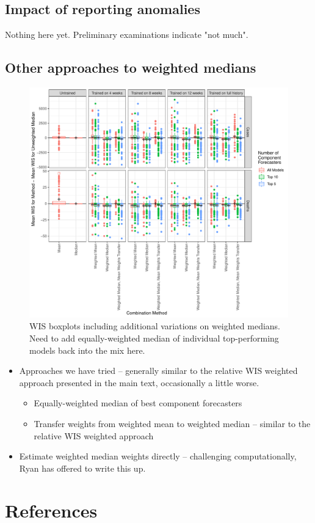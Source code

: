 \documentclass[review]{elsarticle}
\begin{document}
\subsection{Impact of reporting anomalies}

Nothing here yet.  Preliminary examinations indicate "not much".

\subsection{Other approaches to weighted medians}


\begin{figure}
  \includegraphics[width=\textwidth]{figures/wis_boxplots_all_combine_methods.pdf}
  \caption{WIS boxplots including additional variations on weighted medians.  Need to add equally-weighted median of individual top-performing models back into the mix here.}
\end{figure}



\begin{itemize}
  \item Approaches we have tried -- generally similar to the relative WIS weighted approach presented in the main text, occasionally a little worse.
  \begin{itemize}
    \item Equally-weighted median of best component forecasters
    \item Transfer weights from weighted mean to weighted median -- similar to the relative WIS weighted approach
  \end{itemize}
  \item Estimate weighted median weights directly -- challenging computationally, Ryan has offered to write this up.
\end{itemize}

\section*{References}


\end{document}

